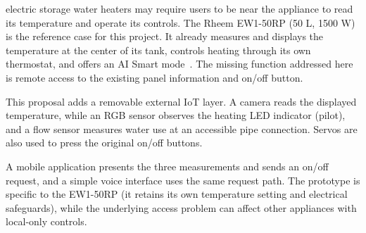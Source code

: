  electric storage water heaters may require users to be near the appliance to read its temperature and operate its controls. The Rheem EW1-50RP (50 L, 1500 W) is the reference case for this project. It already measures and displays the temperature at the center of its tank, controls heating through its own thermostat, and offers an AI Smart mode~\cite{rheemmanual}. The missing function addressed here is remote access to the existing panel information and on/off button.

This proposal adds a removable external IoT layer. A camera reads the displayed temperature, while an RGB sensor observes the heating LED indicator (pilot), and a flow sensor measures water use at an accessible pipe connection. Servos are also used to press the original on/off buttons.

A mobile application presents the three measurements and sends an on/off request, and a simple voice interface uses the same request path. The prototype is specific to the EW1-50RP (it retains its own temperature setting and electrical safeguards), while the underlying access problem can affect other appliances with local-only controls.
